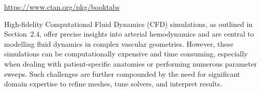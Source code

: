 \documentclass{article}
\begin{document}
\begin{center}
  \url{https://www.ctan.org/pkg/booktabs}
\end{center}








High-fidelity Computational Fluid Dynamics (CFD) simulations, as outlined in Section~2.4, offer precise insights into arterial hemodynamics and are central to modelling fluid dynamics in complex vascular geometries. However, these simulations can be computationally expensive and time consuming, especially when dealing with patient-specific anatomies or performing numerous parameter sweeps. Such challenges are further compounded by the need for significant domain expertise to refine meshes, tune solvers, and interpret results.
\end{document}
